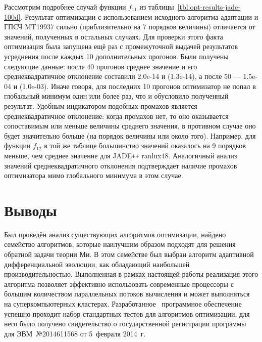 Рассмотрим подробнее случай функции $f_{11}$ из
таблицы~\ref{tbl:opt-results-jade-100d}.  Результат оптимизации с использованием исходного алгоритма адаптации и ГПСЧ MT19937 сильно (приблизительно на 7 порядков величины) отличается от
значений, полученных в остальных случаях.  Для проверки этого факта
оптимизация была запущена ещё раз с промежуточной выдачей результатов
усреднения после каждых 10 дополнительных прогонов.  Были получены
следующие данные: после 40 прогонов среднее значение и его
среднеквадратичное отклонение составили 2.0e-14 и (1.3e-14), а после
50 --- 1.5e-04 и (1.0e-03).  Иначе говоря, для последних 10 прогонов
оптимизатор не попал в глобальный минимум один или более раз, что и
обусловило полученный результат.  Удобным индикатором подобных
промахов является среднеквадратичное отклонение: когда промахов
нет, то оно оказывается сопоставимым или меньше величины среднего значения,
в противном случае оно будет значительно больше (на порядок величины или около того).
 Например, для функции $f_{12}$ в той же таблице большинство
значений оказалось на 9 порядков меньше, чем среднее значение для
JADE\texttt{++} ranlux48. Аналогичный анализ значений среднеквадратичного
отклонения подтверждает наличие промахов оптимизатора мимо глобального
минимума в этом случае.

\section{Выводы}
 
Был проведён анализ существующих алгоритмов оптимизации, найдено
семейство алгоритмов, которые наилучшим образом подходят для решения
обратной задачи теории Ми. В этом семействе был выбран алгоритм
адаптивной дифференциальной эволюции, как обладающий наибольшей
производительностью.  Выполненная в рамках настоящей работы реализация
этого алгоритма позволяет эффективно использовать современные
процессоры с большим количеством параллельных потоков вычисления и
может выполняться на суперкомпьютерных кластерах.
Разработанное~\cite{JADE-web} программное обеспечение успешно проходит
набор стандартных тестов для алгоритмов оптимизации, для него было получено
свидетельство о государственной регистрации программы для
ЭВМ~№2014611568 от 5~февраля 2014~г.
\clearpage